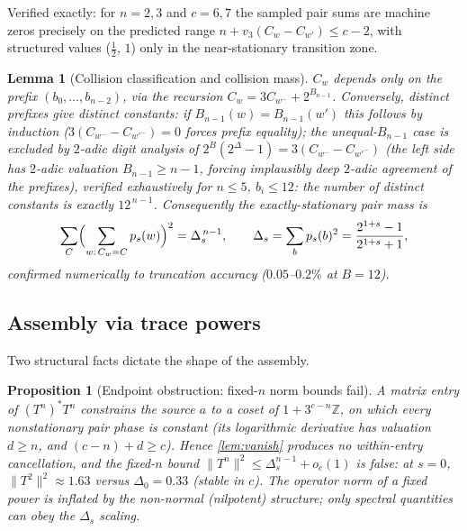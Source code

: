 \documentclass[11pt]{article}
\newcommand{\Z}{\mathbb{Z}}
\theoremstyle{plain}
\newtheorem{proposition}{Proposition}
\newtheorem{lemma}{Lemma}
\theoremstyle{definition}
\theoremstyle{remark}
\begin{document}
\noindent Verified exactly: for $n=2,3$ and $c=6,7$ the sampled pair sums are
machine zeros precisely on the predicted range $n+v_3(C_w-C_{w'})\le c-2$, with
structured values ($\tfrac12$, $1$) only in the near-stationary transition
zone.

\begin{lemma}[Collision classification and collision mass]\label{lem:collision}
$C_w$ depends only on the prefix $(b_0,\dots,b_{n-2})$, via the recursion
$C_w=3C_{w^-}+2^{B_{n-1}}$. Conversely, distinct prefixes give distinct
constants: if $B_{n-1}(w)=B_{n-1}(w')$ this follows by induction
($3(C_{w^-}-C_{w'^-})=0$ forces prefix equality); the unequal-$B_{n-1}$ case is
excluded by $2$-adic digit analysis of
$2^{B}(2^{\Delta}-1)=3(C_{w^-}-C_{w'^-})$ (the left side has $2$-adic valuation
$B_{n-1}\ge n-1$, forcing implausibly deep $2$-adic agreement of the prefixes),
verified exhaustively for $n\le5$, $b_i\le12$: the number of distinct constants
is exactly $12^{\,n-1}$. Consequently the exactly-stationary pair mass is
\[
\sum_{C}\Bigl(\sum_{w:\,C_w=C}p_s(w)\Bigr)^2=\Delta_s^{\,n-1},
\qquad
\Delta_s=\sum_b p_s(b)^2=\frac{2^{1+s}-1}{2^{1+s}+1},
\]
confirmed numerically to truncation accuracy ($0.05$--$0.2\%$ at $B=12$).
\end{lemma}

\subsection*{Assembly via trace powers}

Two structural facts dictate the shape of the assembly.

\begin{proposition}[Endpoint obstruction: fixed-$n$ norm bounds fail]
\label{prop:endpoint}
A matrix entry of $(T^n)^*T^n$ constrains the source $a$ to a coset of
$1+3^{c-n}\Z$, on which every nonstationary pair phase is \emph{constant}
(its logarithmic derivative has valuation $d\ge n$, and
$(c-n)+d\ge c$). Hence \cref{lem:vanish} produces no within-entry
cancellation, and the fixed-$n$ bound
$\lVert T^n\rVert^2\le\Delta_s^{n-1}+o_c(1)$ is \emph{false}: at $s=0$,
$\lVert T^2\rVert^2\approx1.63$ versus $\Delta_0=0.33$ (stable in $c$). The
operator norm of a fixed power is inflated by the non-normal (nilpotent)
structure; only spectral quantities can obey the $\Delta_s$ scaling.
\end{proposition}
\end{document}
